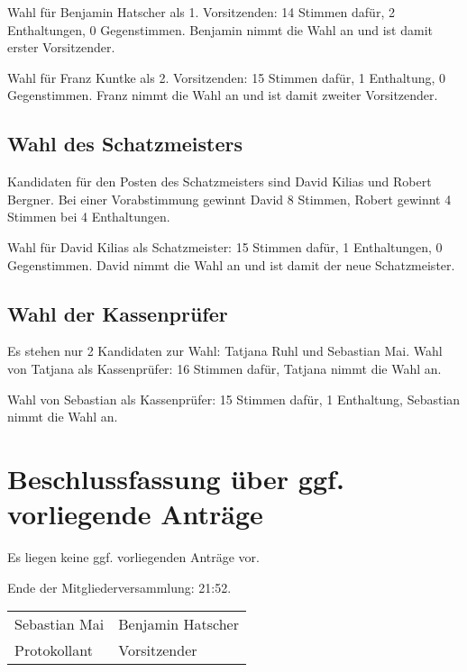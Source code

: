 \documentclass[a4paper,12pt,titlepage]{scrartcl}
\begin{document}
Wahl für Benjamin Hatscher als 1. Vorsitzenden: 14 Stimmen dafür, 2 Enthaltungen, 0 Gegenstimmen. Benjamin nimmt die Wahl an und ist damit erster Vorsitzender.
    
Wahl für Franz Kuntke als 2. Vorsitzenden: 15 Stimmen dafür, 1 Enthaltung, 0 Gegenstimmen. Franz nimmt die Wahl an und ist damit zweiter Vorsitzender.


\subsection{ Wahl des Schatzmeisters }
Kandidaten für den Posten des Schatzmeisters sind David Kilias und Robert Bergner. Bei einer Vorabstimmung gewinnt David 8 Stimmen, Robert gewinnt 4 Stimmen bei 4 Enthaltungen.

Wahl für David Kilias als Schatzmeister: 15 Stimmen dafür, 1 Enthaltungen, 0 Gegenstimmen. David nimmt die Wahl an und ist damit der neue Schatzmeister.


\subsection{ Wahl der Kassenprüfer }
Es stehen nur 2 Kandidaten zur Wahl: Tatjana Ruhl und Sebastian Mai.
Wahl von Tatjana als Kassenprüfer: 16 Stimmen dafür, Tatjana nimmt die Wahl an.

Wahl von Sebastian als Kassenprüfer: 15 Stimmen dafür, 1 Enthaltung, Sebastian nimmt die Wahl an.


\section{Beschlussfassung über ggf. vorliegende Anträge}
Es liegen keine ggf. vorliegenden Anträge vor.


Ende der Mitgliederversammlung: 21:52.


\nopagebreak
\vspace{10\baselineskip}
\begin{tabularx}{\textwidth}[b]{X X}
	\hline
	Sebastian Mai  & Benjamin Hatscher \\
	Protokollant & Vorsitzender
\end{tabularx}

\appendix
%
\end{document}
